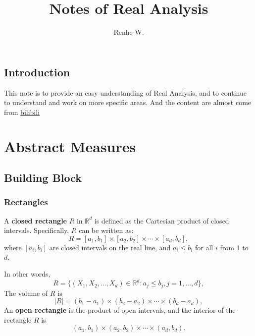 \documentclass[UTF8,12pt,AutoFakeBold]{ctexbook}
\title{Notes of Real Analysis}
\author{Renhe W.}
\date{}
\numberwithin{equation}{section}
\begin{document}
	\maketitle
	\tableofcontents
	
	\newpage
	\kaishu
	\section{Introduction}
	This note is to provide an easy understanding of Real Analysis, and to continue to understand and work on more specific areas. And the content are almost come from \href{https://www.bilibili.com/video/BV1FT411C7wM/?spm_id_from=333.337.search-card.all.click&vd_source=ba9c3e9308deddcceb8190c43ed27dfd}{bilibili}
	
	
	\chapter{Abstract Measures}
	\section{Building Block}
	
	\subsection{Rectangles}
	\begin{definition}
		A \textbf{closed rectangle} $R$ in $\mathbb{R}^d$ is defined as the Cartesian product of closed intervals. Specifically, $R$ can be written as:
		$$
		R=\left[a_1, b_1\right] \times\left[a_2, b_2\right] \times \cdots \times\left[a_d, b_d\right],
		$$
		where $\left[a_i, b_i\right]$ are closed intervals on the real line, and $a_i \leq b_i$ for all $i$ from 1 to $d$.
		
		In other words,
		$$
		R = \{(X_1,X_2,\dots,X_d)\in\mathbb{R}^d:a_j\leq b_j, j = 1,\dots,d\},
		$$
		The {\color{blue}volume} of $R$ is
		$$
			\left | R \right | = \left(b_1-a_1\right) \times \left(b_2-a_2\right) \times \cdots \times\left(b_d-a_d\right),
		$$
		An \textbf{open rectangle} is the product of open intervals, and the interior of the rectangle $R$ is
		$$
			\left(a_1, b_1\right) \times\left(a_2, b_2\right) \times \cdots \times\left(a_d, b_d\right).
		$$
	\end{definition}
	
\end{document}
